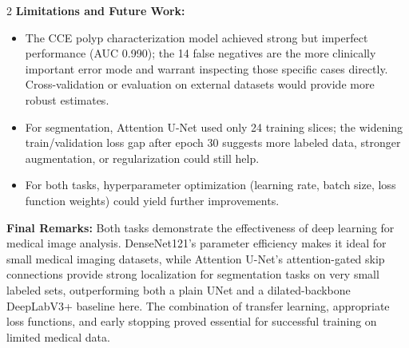 ﻿\documentclass[a4paper,10pt]{article}
\begin{document}
\begin{multicols*}{2}
\textbf{Limitations and Future Work:}
\begin{itemize}
	\item The CCE polyp characterization model achieved strong but imperfect performance (AUC 0.990); the 14 false negatives are the more clinically important error mode and warrant inspecting those specific cases directly. Cross-validation or evaluation on external datasets would provide more robust estimates.
	\item For segmentation, Attention U-Net used only 24 training slices; the widening train/validation loss gap after epoch 30 suggests more labeled data, stronger augmentation, or regularization could still help.
	\item For both tasks, hyperparameter optimization (learning rate, batch size, loss function weights) could yield further improvements.\\
\end{itemize}

\columnbreak

\textbf{Final Remarks:} Both tasks demonstrate the effectiveness of deep learning for medical image analysis. DenseNet121's parameter efficiency makes it ideal for small medical imaging datasets, while Attention U-Net's attention-gated skip connections provide strong localization for segmentation tasks on very small labeled sets, outperforming both a plain UNet and a dilated-backbone DeepLabV3+ baseline here. The combination of transfer learning, appropriate loss functions, and early stopping proved essential for successful training on limited medical data.

\end{multicols*}
\end{document}
